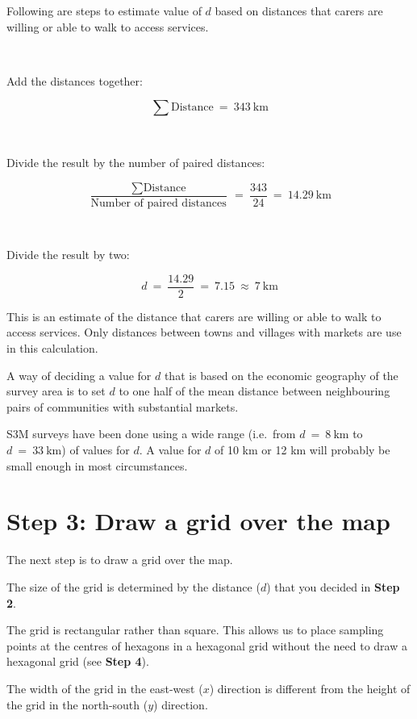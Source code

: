 \documentclass[12pt,a4paper]{book}
\theoremstyle{definition}
\theoremstyle{definition}
\theoremstyle{definition}
\theoremstyle{remark}
\let\BeginKnitrBlock\begin \let\EndKnitrBlock\end
\begin{document}
\BeginKnitrBlock{rmdcalc}
Following are steps to estimate value of \(d\) based on distances that
carers are willing or able to walk to access services.

~

Add the distances together:

\[ \sum \text{Distance} ~ = ~ 343 ~ \text{km} \]

~

Divide the result by the number of paired distances:

\[ \frac{\sum \text{Distance}}{\text{Number of paired distances}} ~ = ~ \frac{343}{24} ~ = ~ 14.29 ~ \text{km} \]

~

Divide the result by two:

\[ d ~ = ~ \frac{14.29}{2} ~ = ~ 7.15 ~ \approx ~ 7 ~ \text{km} \]
\EndKnitrBlock{rmdcalc}

This is an estimate of the distance that carers are willing or able to
walk to access services. Only distances between towns and villages with
markets are use in this calculation.

A way of deciding a value for \(d\) that is based on the economic
geography of the survey area is to set \(d\) to one half of the mean
distance between neighbouring pairs of communities with substantial
markets.

S3M surveys have been done using a wide range (i.e.~from
\(d ~ = ~ 8 ~ \text{km}\) to \(d ~ = ~ 33 ~ \text{km}\)) of values for
\(d\). A value for \(d\) of 10 km or 12 km will probably be small enough
in most circumstances.

\newpage

\hypertarget{step-3-draw-a-grid-over-the-map}{%
\section{Step 3: Draw a grid over the
map}\label{step-3-draw-a-grid-over-the-map}}

The next step is to draw a grid over the map.

The size of the grid is determined by the distance (\(d\)) that you
decided in \textbf{Step 2}.

The grid is rectangular rather than square. This allows us to place
sampling points at the centres of hexagons in a hexagonal grid without
the need to draw a hexagonal grid (see \textbf{Step 4}).

The width of the grid in the east-west (\(x\)) direction is different
from the height of the grid in the north-south (\(y\)) direction.
\end{document}
